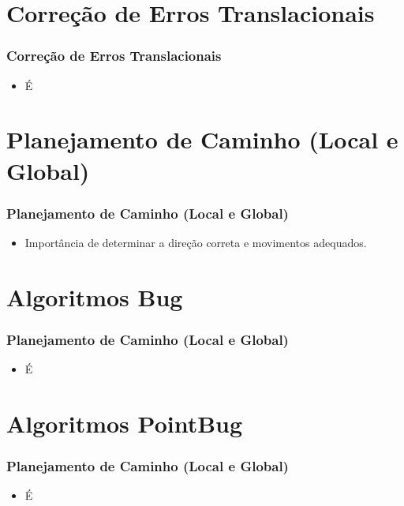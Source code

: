 \documentclass[xcolor=dvipsnames, aspectratio=169]{beamer}
\begin{document}
\section{Correção de Erros Translacionais}
\begin{frame}
  \frametitle{Correção de Erros Translacionais}
  \begin{itemize}
    \item É
  \end{itemize}
  
\end{frame}


\section{Planejamento de Caminho (Local e Global)}
\begin{frame}
  \frametitle{Planejamento de Caminho (Local e Global)}
  \begin{itemize}
    \item Importância de determinar a direção correta e movimentos adequados.
  \end{itemize}
\end{frame}

\section{Algoritmos Bug}
\begin{frame}
  \frametitle{Planejamento de Caminho (Local e Global)}
  \begin{itemize}
    \item É
  \end{itemize}
\end{frame}

\section{Algoritmos PointBug}
\begin{frame}
  \frametitle{Planejamento de Caminho (Local e Global)}
  \begin{itemize}
    \item É
  \end{itemize}
\end{frame}
  
\end{document}
